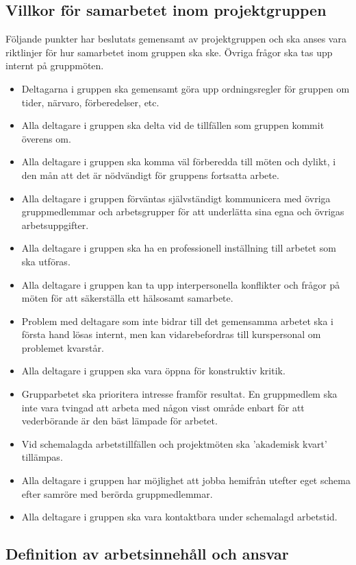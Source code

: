 \documentclass[a4paper,11pt]{article}
\begin{document}
\subsection{Villkor för samarbetet inom projektgruppen}
Följande punkter har beslutats gemensamt av projektgruppen och ska anses vara riktlinjer för hur samarbetet inom gruppen ska ske. Övriga frågor ska tas upp internt på gruppmöten.

\begin{itemize}
\item Deltagarna i gruppen ska gemensamt göra upp ordningsregler för gruppen om tider, närvaro, förberedelser, etc.
\item Alla deltagare i gruppen ska delta vid de tillfällen som gruppen kommit överens om.
\item Alla deltagare i gruppen ska komma väl förberedda till möten och dylikt, i den mån att det är nödvändigt för gruppens fortsatta arbete.
\item Alla deltagare i gruppen förväntas självständigt kommunicera med övriga gruppmedlemmar och arbetsgrupper för att underlätta sina egna och övrigas arbetsuppgifter.
\item Alla deltagare i gruppen ska ha en professionell inställning till arbetet som ska utföras.
\item Alla deltagare i gruppen kan ta upp interpersonella konflikter och frågor på möten för att säkerställa ett hälsosamt samarbete.
\item Problem med deltagare som inte bidrar till det gemensamma arbetet ska i första hand lösas internt, men kan vidarebefordras till kurspersonal om problemet kvarstår.
\item Alla deltagare i gruppen ska vara öppna för konstruktiv kritik.
\item Grupparbetet ska prioritera intresse framför resultat. En gruppmedlem ska inte vara tvingad att arbeta med någon visst område enbart för att vederbörande är den bäst lämpade för arbetet.
\item Vid schemalagda arbetstillfällen och projektmöten ska 'akademisk kvart' tillämpas.
\item Alla deltagare i gruppen har möjlighet att jobba hemifrån utefter eget schema efter samröre med berörda gruppmedlemmar.
\item Alla deltagare i gruppen ska vara kontaktbara under schemalagd arbetstid.
\end{itemize}

\subsection{Definition av arbetsinnehåll och ansvar}
\end{document}
